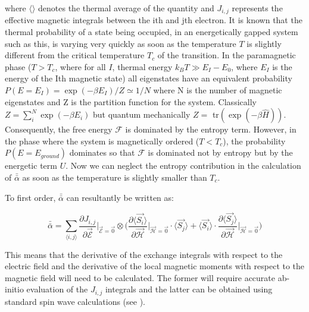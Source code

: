 \documentclass[10pt]{article}
\begin{document}
where $\langle \rangle$ denotes the thermal average of the quantity and $J_{i,j}$ represents the effective magnetic integrals between the ith and jth electron. It is known that the thermal probability of a state being occupied, in an energetically gapped system such as this, is varying very quickly as soon as the temperature $T$ is slightly different from the critical temperature $T_c$ of the transition. In the paramagnetic phase ($T > T_c$, where for all $I$, thermal energy $k_B T \gg E_I - E_0$, where $E_I$ is the energy of the Ith magnetic state) all eigenstates have an equivalent probability $P(E = E_I) = \exp(-\beta E_I)/Z \simeq 1/N$ where N is the number of magnetic eigenstates and Z is the partition function for the system. Classically $Z = \sum_{i}^{N} \exp(-\beta E_i)$ but quantum mechanically $Z =$ tr$(\exp(-\beta \hat{H}))$. Consequently, the free energy $\mathcal{F}$ is dominated by the entropy term. However, in the phase where the system is magnetically ordered ($T < T_c$), the probability $P(E = E_{ground})$ dominates so that $\mathcal{F}$ is dominated not by entropy but by the energetic term $U$. Now we can neglect the entropy contribution in the calculation of $\bar{\bar{\alpha}}$ as soon as the temperature is slightly smaller than $T_c$.

To first order, $\bar{\bar{\alpha}}$ can resultantly be written as:

\begin{equation}
	\bar{\bar{\alpha}} = \sum_{\langle i,j \rangle} \frac{\partial J_{i,j}}{\partial \vec{\mathcal{E}}}\biggr\vert_{\vec{\mathcal{E}}=\vec{0}}\otimes\biggr(\frac{\partial \langle \vec{S_i}\rangle}{\partial \vec{\mathcal{H}}}\biggr\vert_{\vec{\mathcal{H}} = \vec{0}}\cdot\langle\vec{S_j}\rangle + \langle\vec{S_i}\rangle\cdot\frac{\partial \langle \vec{S_j}\rangle}{\partial\vec{\mathcal{H}}}\biggr\vert_{\vec{\mathcal{H}}=\vec{0}}\biggr)
\end{equation}

This means that the derivative of the exchange integrals with respect to the electric field and the derivative of the local magnetic moments with respect to the magnetic field will need to be calculated. The former will require accurate ab-initio evaluation of the $J_{i,j}$ integrals and the latter can be obtained using standard spin wave calculations (see \cite{anderson1951limits,kubo1952spin,oguchi1960theory}).
\end{document}
